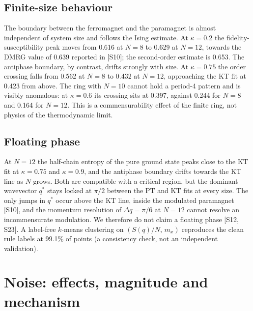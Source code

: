 \documentclass[10pt,twocolumn]{article}
\begin{document}
\subsection{Finite-size behaviour}
The boundary between the ferromagnet and the paramagnet is almost independent of system size and follows the Ising estimate. At $\kappa=0.2$ the fidelity-susceptibility peak moves from 0.616 at $N=8$ to 0.629 at $N=12$, towards the DMRG value of 0.639 reported in [S10]; the second-order estimate is 0.653. The antiphase boundary, by contrast, drifts strongly with size. At $\kappa=0.75$ the order crossing falls from 0.562 at $N=8$ to 0.432 at $N=12$, approaching the KT fit at 0.423 from above. The ring with $N=10$ cannot hold a period-4 pattern and is visibly anomalous: at $\kappa=0.6$ its crossing sits at 0.397, against 0.244 for $N=8$ and 0.164 for $N=12$. This is a commensurability effect of the finite ring, not physics of the thermodynamic limit.

\subsection{Floating phase}
At $N=12$ the half-chain entropy of the pure ground state peaks close to the KT fit at $\kappa=0.75$ and $\kappa=0.9$, and the antiphase boundary drifts towards the KT line as $N$ grows. Both are compatible with a critical region, but the dominant wavevector $q^*$ stays locked at $\pi/2$ between the PT and KT fits at every size. The only jumps in $q^*$ occur above the KT line, inside the modulated paramagnet [S10], and the momentum resolution of $\Delta q=\pi/6$ at $N=12$ cannot resolve an incommensurate modulation. We therefore do not claim a floating phase [S12, S23]. A label-free $k$-means clustering on $(S(q)/N,\,m_x)$ reproduces the clean rule labels at 99.1\% of points (a consistency check, not an independent validation).

\section{Noise: effects, magnitude and mechanism}
\end{document}
